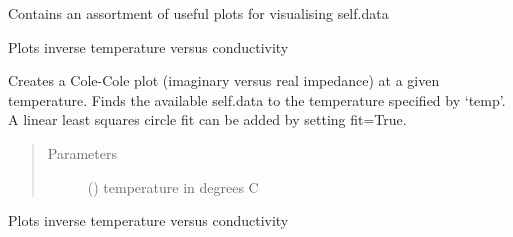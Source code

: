 \documentclass[letterpaper,10pt,english]{sphinxmanual}
\begin{document}
\begin{fulllineitems}
\label{\detokenize{plotting:plotting.LabPlots}}
Contains an assortment of useful plots for visualising self.data

\begin{fulllineitems}
\label{\detokenize{plotting:plotting.LabPlots.arrhenius}}
Plots inverse temperature versus conductivity

\end{fulllineitems}


\begin{fulllineitems}
\label{\detokenize{plotting:plotting.LabPlots.cole}}
Creates a Cole-Cole plot (imaginary versus real impedance) at a given temperature. Finds the available self.data to the temperature specified by ‘temp’. A linear least squares circle fit can be added by setting fit=True.
\begin{quote}\begin{description}
\item[{Parameters}] \leavevmode
{} () \textendash{} temperature in degrees C

\end{description}\end{quote}

\end{fulllineitems}


\begin{fulllineitems}
\label{\detokenize{plotting:plotting.LabPlots.cond_fug}}
Plots inverse temperature versus conductivity

\end{fulllineitems}


\end{fulllineitems}
\end{document}
